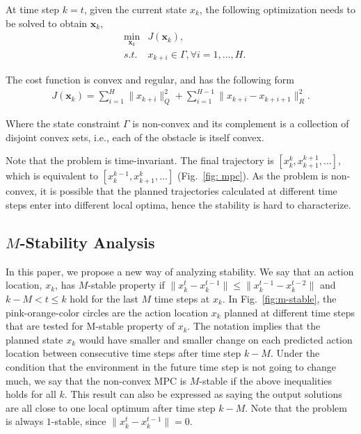 \documentclass{ifacconf}
\begin{document}
At time step $k=t$, given the current state $x_k$, the following optimization needs to be solved to obtain $\mathbf{x}_k$,
\begin{eqnarray}
&\min_{\mathbf{x}_{k}} & J(\mathbf{x}_k),\\
&s.t.& x_{k+i}\in\Gamma,\forall i=1,\ldots,H.
\end{eqnarray}

\begin{assum}[Cost]
The cost function is convex and regular, and has the following form
\begin{eqnarray}
J(\mathbf{x}_k) = \sum_{i=1}^{H} \|x_{k+i}\|_{Q}^2 + \sum_{i=1}^{H-1} \|x_{k+i}-x_{k+i+1}\|_R^2.
\end{eqnarray}
\end{assum}

\begin{assum}[Constraint]
Where the state constraint $\Gamma$ is non-convex and its complement is a collection of disjoint convex sets, i.e., each of the obstacle is itself convex.
\end{assum}

Note that the problem is time-invariant. The final trajectory is $[x_k^k,x_{k+1}^{k+1},\ldots]$, which is equivalent to $[x_{k}^{k-1},x_{k+1}^{k},\ldots]$ (Fig.~\ref{fig: mpc}). As the problem is non-convex, it is possible that the planned trajectories calculated at different time steps enter into different local optima, hence the stability is hard to characterize. 

\subsection{$M$-Stability Analysis}
In this paper, we propose a new way of analyzing stability.
We say that an action location, $x_{k}$, has $M$-stable property if $\|x_{k}^t-x_k^{t-1}\|\leq \|x_k^{t-1}-x_k^{t-2}\|$ and $k-M< t\leq k$ hold for the last $M$ time steps at $x_{k}$. In Fig.~\ref{fig:m-stable}, the pink-orange-color circles are the action location $x_{k}$ planned at different time steps that are  tested for M-stable property of $x_{k}$. The notation implies that the planned state $x_k$ would have smaller and smaller change on each predicted action location between consecutive time steps after time step $k-M$. Under the condition that the environment in the future time step is not going to change much, we say that the non-convex MPC is $M$-stable if the above inequalities holds for all $k$. This result can also be expressed as saying the output solutions are all close to one local optimum after time step $k-M$. Note that the problem is always $1$-stable, since $\|x_{k}^t-x_k^{t-1}\|=0$.
\end{document}
